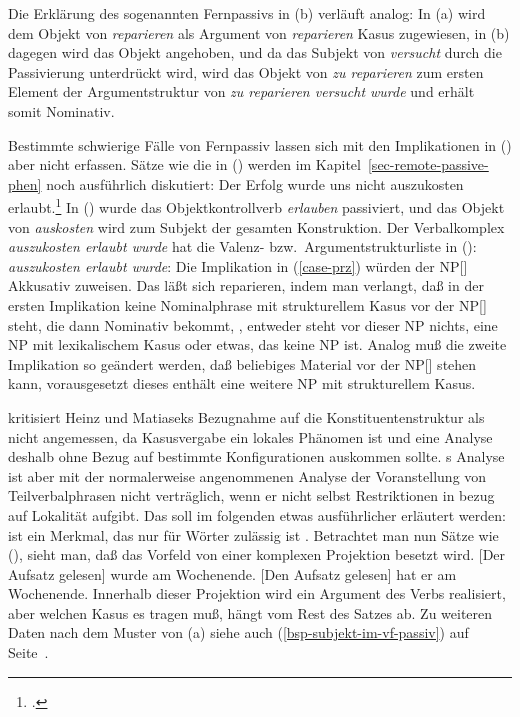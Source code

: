 Die Erklärung des sogenannten Fernpassivs in (b) verläuft analog:
In (a) wird dem Objekt von \emph{reparieren} als Argument von \emph{reparieren} Kasus
zugewiesen, in (b) dagegen wird das Objekt angehoben, und da
das Subjekt von \emph{versucht} durch die Passivierung unterdrückt wird,
wird das Objekt von \emph{zu reparieren} zum ersten Element der
Argumentstruktur von \emph{zu reparieren versucht wurde} und erhält somit
Nominativ.

Bestimmte schwierige Fälle von Fernpassiv lassen sich mit den Implikationen
in () aber nicht erfassen. Sätze wie die
in () werden im Kapitel~\ref{sec-remote-passive-phen}
noch ausführlich diskutiert:
\ea\label{erfolg-auszukosten-erlaubt-kasus}
Der Erfolg        wurde uns      nicht auszukosten erlaubt.\footnote{
        .%
}
\z
In () wurde das Objektkontrollverb \emph{erlauben} passiviert,
und das Objekt von \emph{auskosten} wird zum Subjekt der gesamten Konstruktion.
Der Verbalkomplex \emph{auszukosten erlaubt wurde} hat die Valenz- bzw.\
Argumentstrukturliste in ():
\ea
\emph{auszukosten erlaubt wurde}:   \subcat {}
\z
Die Implikation in (\ref{case-prz}) würden der NP[\str] Akkusativ zuweisen.
Das läßt sich reparieren, indem man verlangt, daß in der ersten Implikation
keine Nominalphrase mit strukturellem Kasus vor der NP[\str] steht, die dann
Nominativ bekommt, \dash, entweder steht vor dieser NP nichts, eine NP mit lexikalischem
Kasus oder etwas, das keine NP ist. Analog muß die zweite Implikation 
so geändert werden, daß beliebiges Material vor der NP[\str] stehen kann,
vorausgesetzt dieses enthält eine weitere NP mit strukturellem Kasus.

\prz kritisiert Heinz und Matiaseks Bezugnahme auf die Konstituentenstruktur
als nicht angemessen, da Kasusvergabe ein lokales Phänomen ist und eine
Analyse deshalb ohne Bezug auf bestimmte Konfigurationen auskommen sollte. \prz{}s Analyse ist aber
mit der normalerweise angenommenen Analyse der Voranstellung von Teilverbalphrasen nicht verträglich, wenn er nicht
selbst Restriktionen in bezug auf Lokalität\is{Lokalität} aufgibt. Das soll im folgenden
etwas ausführlicher erläutert werden: \argst ist ein Merkmal, das nur für
Wörter zulässig ist \citep[\page 236]{Prze99}. Betrachtet man nun Sätze wie
(\mex{1}), sieht man, daß das Vorfeld von einer komplexen Projektion
besetzt wird.
\eal
\label{bsp-der-aufsatz-gelesen}
\ex {}[Der Aufsatz gelesen] wurde am Wochenende.
\ex {}[Den Aufsatz gelesen] hat er am Wochenende.
\zl
Innerhalb dieser Projektion wird ein Argument des Verbs realisiert,
aber welchen Kasus es tragen muß, hängt vom Rest des Satzes ab.
Zu weiteren Daten nach dem Muster von (a)
siehe auch (\ref{bsp-subjekt-im-vf-passiv}) auf Seite~\pageref{bsp-subjekt-im-vf-passiv}.


